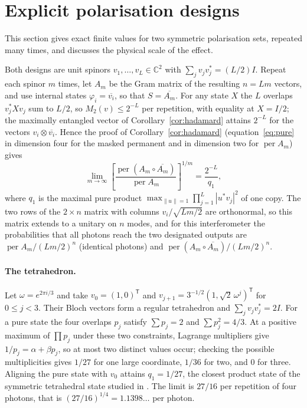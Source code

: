 \documentclass[11pt,a4paper]{article}
\theoremstyle{remark}
\newcommand{\per}{\operatorname{per}}
\newcommand{\norm}[1]{\left\lVert#1\right\rVert}
\newcommand{\C}{\mathbb C}
\begin{document}
\section{Explicit polarisation designs}\label{sec:designs}
This section gives exact finite values for two symmetric polarisation sets, repeated many times, and discusses the physical scale of the effect.

Both designs are unit spinors $v_1,\dots,v_L\in\C^2$ with $\sum_jv_jv_j^*=(L/2)I$. Repeat each spinor $m$ times, let $A_m$ be the Gram matrix of the resulting $n=Lm$ vectors, and use internal states $\varphi_i=\overline{v_i}$, so that $S=\overline{A_m}$. For any state $X$ the $L$ overlaps $v_j^*Xv_j$ sum to $L/2$, so $M_2(v)\le 2^{-L}$ per repetition, with equality at $X=I/2$; the maximally entangled vector of Corollary~\ref{cor:hadamard} attains $2^{-L}$ for the vectors $v_i\otimes\overline{v_i}$. Hence the proof of Corollary~\ref{cor:hadamard} (equation~\eqref{eq:pure} in dimension four for the masked permanent and in dimension two for $\per A_m$) gives
\[
 \lim_{m\to\infty}\left[\frac{\per(A_m\circ\overline{A_m})}{\per A_m}\right]^{1/m}=\frac{2^{-L}}{q_1},
\]
where $q_1$ is the maximal pure product $\max_{\norm u=1}\prod_{j=1}^L|u^*v_j|^2$ of one copy. The two rows of the $2\times n$ matrix with columns $v_i/\sqrt{Lm/2}$ are orthonormal, so this matrix extends to a unitary on $n$ modes, and for this interferometer the probabilities that all photons reach the two designated outputs are $\per A_m/(Lm/2)^n$ (identical photons) and $\per(A_m\circ\overline{A_m})/(Lm/2)^n$.

\paragraph{The tetrahedron.}
Let $\omega=e^{2\pi i/3}$ and take $v_0=(1,0)^{\mathsf T}$ and $v_{j+1}=3^{-1/2}(1,\sqrt2\,\omega^j)^{\mathsf T}$ for $0\le j<3$. Their Bloch vectors form a regular tetrahedron and $\sum_jv_jv_j^*=2I$. For a pure state the four overlaps $p_j$ satisfy $\sum p_j=2$ and $\sum p_j^2=4/3$. At a positive maximum of $\prod p_j$ under these two constraints, Lagrange multipliers give $1/p_j=\alpha+\beta p_j$, so at most two distinct values occur; checking the possible multiplicities gives $1/27$ for one large coordinate, $1/36$ for two, and $0$ for three. Aligning the pure state with $v_0$ attains $q_1=1/27$, the closest product state of the symmetric tetrahedral state studied in \cite{AMM}. The limit is $27/16$ per repetition of four photons, that is $(27/16)^{1/4}=1.1398\ldots$ per photon.
\end{document}
